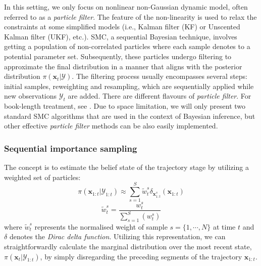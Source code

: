 In this setting, we only focus on nonlinear non-Gaussian dynamic model, often referred to as a \textit{particle filter}. The feature of the non-linearity is used to relax the constraints at some simplified models (i.e., Kalman filter (KF) or Unscented Kalman filter (UKF), etc.). \acrshort{SMC}, a sequential Bayesian technique, involves getting a population of non-correlated particles where each sample denotes to a potential parameter set. Subsequently, these particles undergo filtering to approximate the final distribution in a manner that aligns with the posterior distribution $\pi(\boldsymbol{x}_{t}|\mathcal{Y})$. The filtering process usually encompasses several steps: initial samples, reweighting and resampling, which are sequentially applied while new observations $\mathcal{Y}_{t}$ are added. There are different flavours of \textit{particle filter}. For book-length treatment, see \cite{murphy2012}. Due to space limitation, we will only present two standard \acrshort{SMC} algorithms that are used in the context of Bayesian inference, but other effective \textit{particle filter} methods can be also easily implemented.


\subsubsection{Sequential importance sampling}
The concept is to estimate the belief state of the trajectory stage by utilizing a weighted set of particles:
\begin{equation}
    \label{eq: PF-SIS}
\pi(\boldsymbol{x}_{1:t}|\mathcal{Y}_{1:t})
\approx 
\sum_{s=1}^{S} 
\tilde{w}_{t}^{s}
\delta_{\boldsymbol{x}_{1:t}^{s}}(\boldsymbol{x}_{1:t})
\end{equation}
\begin{equation}
    \label{eq: PF-SIS-Normalized_weight}
\tilde{w}_t^s=\frac{w_t^s}{\sum_{s=1}^{S}{(w_t^s)}}
\end{equation}
where $\tilde{w}_{t}^{s}$ represents the normalised weight of sample $s = \{1,\cdots,N\}$ at time $t$ and  $\delta$ denotes the \textit{Dirac delta function}. Utilizing this representation, we can straightforwardly calculate the marginal distribution over the most recent state, $\pi(\boldsymbol{x}_{t}|\mathcal{Y}_{1:t})$, by simply disregarding the preceding segments of the trajectory $\boldsymbol{x}_{1:t}$.

